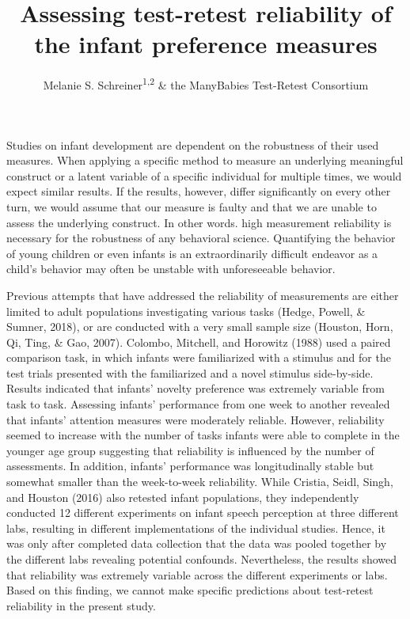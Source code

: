 \documentclass[
  english,
  man,floatsintext]{apa6}
\title{Assessing test-retest reliability of the infant preference measures}
\author{Melanie S. Schreiner\textsuperscript{1,2} \& the ManyBabies Test-Retest Consortium\textsuperscript{}}
\date{}
\affiliation{\vspace{0.5cm}\textsuperscript{1} University of Goettingen\\\textsuperscript{2} Leibniz Science Campus PrimateCognition}
\begin{document}
\maketitle

Studies on infant development are dependent on the robustness of their used measures. When applying a specific method to measure an underlying meaningful construct or a latent variable of a specific individual for multiple times, we would expect similar results. If the results, however, differ significantly on every other turn, we would assume that our measure is faulty and that we are unable to assess the underlying construct. In other words. high measurement reliability is necessary for the robustness of any behavioral science. Quantifying the behavior of young children or even infants is an extraordinarily difficult endeavor as a child's behavior may often be unstable with unforeseeable behavior.

Previous attempts that have addressed the reliability of measurements are either limited to adult populations investigating various tasks (Hedge, Powell, \& Sumner, 2018), or are conducted with a very small sample size (Houston, Horn, Qi, Ting, \& Gao, 2007). Colombo, Mitchell, and Horowitz (1988) used a paired comparison task, in which infants were familiarized with a stimulus and for the test trials presented with the familiarized and a novel stimulus side-by-side. Results indicated that infants' novelty preference was extremely variable from task to task. Assessing infants' performance from one week to another revealed that infants' attention measures were moderately reliable. However, reliability seemed to increase with the number of tasks infants were able to complete in the younger age group suggesting that reliability is influenced by the number of assessments. In addition, infants' performance was longitudinally stable but somewhat smaller than the week-to-week reliability. While Cristia, Seidl, Singh, and Houston (2016) also retested infant populations, they independently conducted 12 different experiments on infant speech perception at three different labs, resulting in different implementations of the individual studies. Hence, it was only after completed data collection that the data was pooled together by the different labs revealing potential confounds. Nevertheless, the results showed that reliability was extremely variable across the different experiments or labs. Based on this finding, we cannot make specific predictions about test-retest reliability in the present study.
\end{document}
